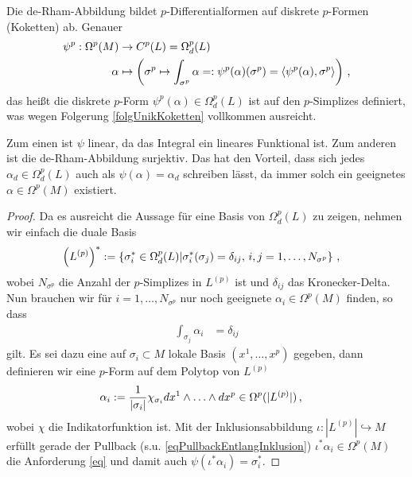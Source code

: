   \begin{definition}
    Die de-Rham-Abbildung bildet \( p \)-Differentialformen auf diskrete \( p \)-Formen (Koketten) ab. 
    Genauer
    \begin{align}
      \begin{aligned}
        \psi^{p}: \Omega^{p}(M) &\rightarrow C^{p}(L) = \Omega_{d}^{p}(L)\\
                       \alpha   &\mapsto \left( \sigma^{p} \mapsto \int_{\sigma^{p}} \alpha =: \psi^{p}(\alpha)(\sigma^{p}) =  \left\langle \psi^{p}(\alpha), \sigma^{p} \right\rangle\right)
                       \,\text{,}
      \end{aligned}
    \end{align}
    das heißt die diskrete \( p \)-Form \( \psi^{p}(\alpha) \in \Omega_{d}^{p}(L)  \) ist auf den \( p \)-Simplizes definiert, was wegen Folgerung \ref{folgUnikKoketten} vollkommen ausreicht.
  \end{definition}

  \begin{folgerung}
    Zum einen ist \( \psi \) linear, da das Integral ein lineares Funktional ist.
    Zum anderen ist die de-Rham-Abbildung surjektiv.
    Das hat den Vorteil, dass sich jedes \( \alpha_{d}\in\Omega_{d}^{p}(L) \) auch als \( \psi(\alpha) = \alpha_{d} \) schreiben lässt, da
    immer solch ein geeignetes \( \alpha\in\Omega^{p}(M) \) existiert.
    \begin{proof}
      Da es ausreicht die Aussage für eine Basis von \( \Omega_{d}^{p}(L) \) zu zeigen, nehmen wir einfach die duale Basis 
      \begin{align}
        \left(L^{(p)}\right)^{*} 
            &:= \left\{\sigma_{i}^{*} \in \Omega_{d}^{p}(L) \middle| \sigma_{i}^{*}(\sigma_{j}) = \delta_{ij}
                                ,\, i,j=1,\ldots,N_{\sigma^{p}} \right\} \,\text{,}
      \end{align}
      wobei \( N_{\sigma^{p}} \) die Anzahl der \( p \)-Simplizes in \( L^{(p)} \) ist und \( \delta_{ij} \) das Kronecker-Delta.
      Nun brauchen wir für \(i=1,\ldots, N_{\sigma^{p}} \) nur noch geeignete \( \alpha_{i}\in\Omega^{p}(M) \) finden, so dass
      \begin{align}
        \label{eq}
        \int_{\sigma_{j}} \alpha_{i} &= \delta_{ij}
      \end{align}
      gilt. Es sei dazu eine auf \( \sigma_{i}\subset M \) lokale Basis \( \left( x^{1},\ldots,x^{p} \right) \) gegeben, dann definieren
      wir eine \( p \)-Form auf dem Polytop von \( L^{(p)} \)
      \begin{align}
        \alpha_{i} &:= \frac{1}{|\sigma_{i}|} \chi_{\sigma_{i}} dx^{1}\wedge\ldots\wedge dx^{p} \in \Omega^{p}(|L^{(p)}|) \,\text{,}
      \end{align}
      wobei \( \chi \) die Indikatorfunktion ist.
      Mit der Inklusionsabbildung \( \iota: |L^{(p)}| \hookrightarrow M\) erfüllt gerade der Pullback (s.u.
      \eqref{eqPullbackEntlangInklusion})
      \( \iota^{*}\alpha_{i}\in\Omega^{p}(M) \) die Anforderung \eqref{eq} 
      und damit auch \( \psi(\iota^{*}\alpha_{i}) = \sigma^{*}_{i} \).
    \end{proof}
  \end{folgerung}

